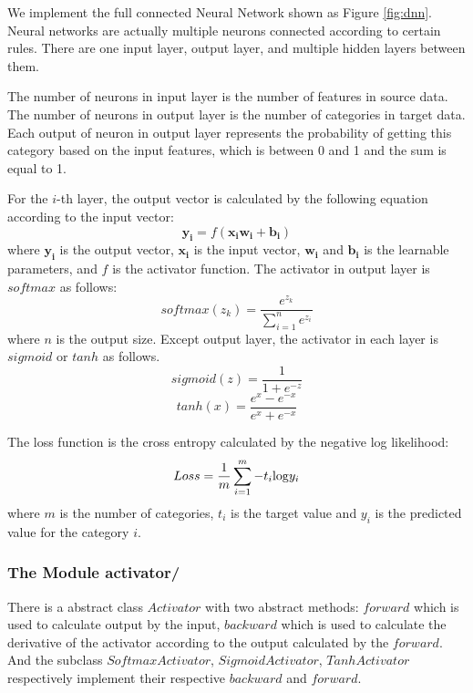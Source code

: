 We implement the full connected Neural Network shown as Figure \ref{fig:dnn}. Neural networks are actually multiple neurons connected according to certain rules. There are one input layer, output layer, and multiple hidden layers between them.

The number of neurons in input layer is the number of features in source data. The number of neurons in output layer is the number of categories in target data. Each output of neuron in output layer represents the probability of getting this category based on the input features, which is between 0 and 1 and the sum is equal to 1.

For the \(i\)-th layer, the output vector is calculated by the following equation according to the input vector:
\begin{equation}
\boldsymbol{y_{i}} = f(\boldsymbol{x_{i}}\boldsymbol{w_i} + \boldsymbol{b_i})
\end{equation}
where \(\boldsymbol{y_{i}}\) is the output vector, \(\boldsymbol{x_{i}}\) is the input vector, \(\boldsymbol{w_{i}}\) and \(\boldsymbol{b_{i}}\) is the learnable parameters, and \(f\) is the activator function. The activator in output layer is \(softmax\) as follows:
\begin{equation}
softmax(z_k) = \frac{e^{z_k}}{\sum_{i=1}^{n}{e^{z_i}}}
\end{equation}
where \(n\) is the output size. Except output layer, the activator in each layer is \(sigmoid\) or \(tanh\) as follows.
\begin{equation}
sigmoid(z) = \frac{1}{1 + e^{-z}}
\end{equation}
\begin{equation}
tanh(x) = \frac{e^{x} - e^{-x}}{e^{x} + e^{-x}}
\end{equation}

The loss function is the cross entropy calculated by the negative log likelihood:
\begin{equation}
Loss = \frac{1}{m}\sum_{i=1}^{m}{-t_{i}{\rm log}y_i}
\end{equation}
where \(m\) is the number of categories, \(t_i\) is the target value and \(y_i\) is the predicted value for the category \(i\).

\subsubsection{The Module activator/}
There is a abstract class \(Activator\) with two abstract methods: \(forward\) which is used to calculate output by the input, \(backward\) which is used to calculate the derivative of the activator according to the output calculated by the \(forward\). And the subclass \(SoftmaxActivator\), \(SigmoidActivator\), \(TanhActivator\) respectively implement their respective \(backward\) and \(forward\).

